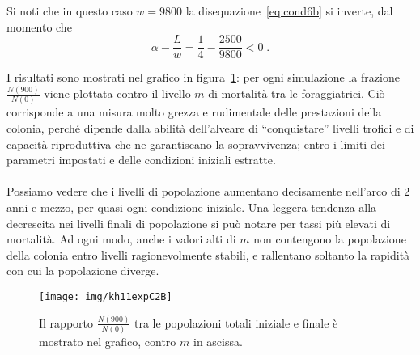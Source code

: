 Si noti che in questo caso $w=9800$ la disequazione~\eqref{eq:cond6b} si inverte, dal momento che
$$ \alpha - \frac{L}{w} = \frac{1}{4} - \frac{2500}{9800} < 0 \; .$$

I risultati sono mostrati nel grafico in figura~\ref{img:kh11expC2B}:
per ogni simulazione la frazione $\frac{N(900)}{N(0)}$ viene plottata contro il livello $m$ di mortalità
tra le foraggiatrici.
Ciò corrisponde a una misura molto grezza e rudimentale delle prestazioni della colonia, perché dipende
dalla abilità dell'alveare di ``conquistare'' livelli trofici e di capacità riproduttiva che ne garantiscano
la sopravvivenza; entro i limiti dei parametri impostati e delle condizioni iniziali estratte.

\paragraph{}
Possiamo vedere che i livelli di popolazione aumentano decisamente nell'arco di 2 anni e mezzo, per
quasi ogni condizione iniziale. Una leggera tendenza alla decrescita nei livelli finali di popolazione
si può notare per tassi più elevati di mortalità. Ad ogni modo, anche i valori alti di $m$ non contengono
la popolazione della colonia entro livelli ragionevolmente stabili, e rallentano soltanto la rapidità
con cui la popolazione diverge.

\begin{figure}[pbh]
    \centering
    \texttt{[image: img/kh11expC2B]}

    \caption[Esperimento C2B]{Il rapporto $\frac{N(900)}{N(0)}$ tra le popolazioni totali iniziale e
    finale è mostrato nel grafico, contro $m$ in ascissa.}

    \label{img:kh11expC2B}
\end{figure}

